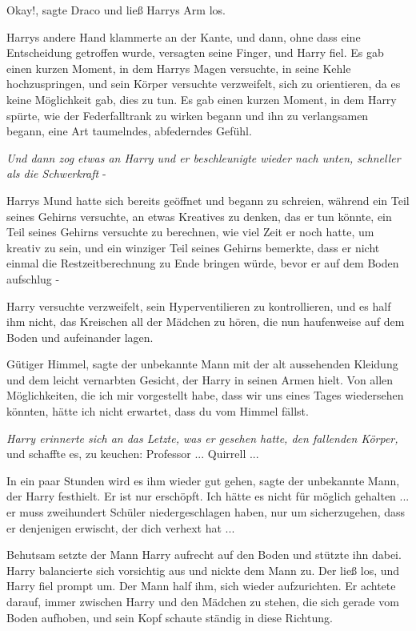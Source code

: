 \glqq{}Okay!\grqq{}, sagte Draco und ließ Harrys Arm los.

Harrys andere Hand klammerte an der Kante, und dann, ohne dass eine Entscheidung
getroffen wurde, versagten seine Finger, und Harry fiel. Es gab einen kurzen
Moment, in dem Harrys Magen versuchte, in seine Kehle hochzuspringen, und sein
Körper versuchte verzweifelt, sich zu orientieren, da es keine Möglichkeit gab,
dies zu tun. Es gab einen kurzen Moment, in dem Harry spürte, wie der
Federfalltrank zu wirken begann und ihn zu verlangsamen begann, eine Art
taumelndes, abfederndes Gefühl.

\emph{Und dann zog etwas an Harry und er beschleunigte wieder nach unten,
schneller als die Schwerkraft} -

Harrys Mund hatte sich bereits geöffnet und begann zu schreien, während ein Teil
seines Gehirns versuchte, an etwas Kreatives zu denken, das er tun könnte, ein
Teil seines Gehirns versuchte zu berechnen, wie viel Zeit er noch hatte, um
kreativ zu sein, und ein winziger Teil seines Gehirns bemerkte, dass er nicht
einmal die Restzeitberechnung zu Ende bringen würde, bevor er auf dem Boden
aufschlug -

Harry versuchte verzweifelt, sein Hyperventilieren zu kontrollieren, und es half
ihm nicht, das Kreischen all der Mädchen zu hören, die nun haufenweise auf dem
Boden und aufeinander lagen.

\glqq{}Gütiger Himmel\grqq{}, sagte der unbekannte Mann mit der alt aussehenden
Kleidung und dem leicht vernarbten Gesicht, der Harry in seinen Armen hielt.
\glqq{}Von allen Möglichkeiten, die ich mir vorgestellt habe, dass wir uns eines
Tages wiedersehen könnten, hätte ich nicht erwartet, dass du vom Himmel fällst.\grqq{}

\emph{Harry erinnerte sich an das Letzte, was er gesehen hatte, den fallenden
Körper,} und schaffte es, zu keuchen: \glqq{}Professor ... Quirrell ...\grqq{}

\glqq{}In ein paar Stunden wird es ihm wieder gut gehen\grqq{}, sagte der
unbekannte Mann, der Harry festhielt. \glqq{}Er ist nur erschöpft. Ich hätte es
nicht für möglich gehalten ... er muss zweihundert Schüler niedergeschlagen
haben, nur um sicherzugehen, dass er denjenigen erwischt, der dich verhext
hat ...\grqq{}

Behutsam setzte der Mann Harry aufrecht auf den Boden und stützte ihn dabei.
Harry balancierte sich vorsichtig aus und nickte dem Mann zu. Der ließ los, und
Harry fiel prompt um. Der Mann half ihm, sich wieder aufzurichten. Er achtete
darauf, immer zwischen Harry und den Mädchen zu stehen, die sich gerade vom
Boden aufhoben, und sein Kopf schaute ständig in diese Richtung.

